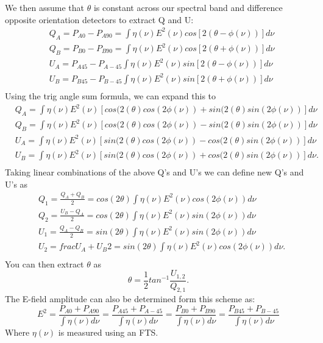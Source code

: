We then assume that $\theta$ is constant across our spectral band and difference opposite orientation detectors to extract Q and U:
\begin{equation}
\begin{split}
&Q_A= P_{A0}-P_{A90}=\int \eta(\nu)E^2(\nu)cos[2(\theta-\phi(\nu))]d\nu \\
&Q_B = P_{B0}-P_{B90}=\int \eta(\nu)E^2(\nu)cos[2(\theta+\phi(\nu))] d\nu \\
&U_A = P_{A45}-P_{A-45}\int \eta(\nu)E^2(\nu)sin[2(\theta-\phi(\nu))] d\nu \\
&U_B =  P_{B45}-P_{B-45}\int \eta(\nu)E^2(\nu)sin[2(\theta+\phi(\nu))] d\nu \\
\end{split}
\end{equation}
Using the trig angle sum formula, we can expand this to
\begin{equation}
\begin{split}
&Q_A= \int \eta(\nu)E^2(\nu)[cos(2(\theta)cos(2\phi(\nu))+sin(2(\theta)sin(2\phi(\nu))]d\nu \\
&Q_B = \int \eta(\nu)E^2(\nu)[cos(2(\theta)cos(2\phi(\nu))-sin(2(\theta)sin(2\phi(\nu))]d\nu \\
&U_A = \int \eta(\nu)E^2(\nu)[sin(2(\theta)cos(2\phi(\nu))-cos(2(\theta)sin(2\phi(\nu))]d\nu \\
&U_B =  \int \eta(\nu)E^2(\nu)[sin(2(\theta)cos(2\phi(\nu))+cos(2(\theta)sin(2\phi(\nu))]d\nu . \\
\end{split}
\end{equation}
Taking linear combinations of the above Q's and U's we can define new Q's and U's as
\begin{equation}
\begin{split}
&Q_1=\frac{Q_A+Q_B}{2}= cos(2\theta)\int \eta(\nu)E^2(\nu)cos(2\phi(\nu))d\nu \\
&Q_2 = \frac{U_B-Q_A}{2}= cos(2\theta)\int \eta(\nu)E^2(\nu)sin(2\phi(\nu))d\nu \\
&U_1 = \frac{Q_A-Q_B}{2}= sin(2\theta)\int \eta(\nu)E^2(\nu)sin(2\phi(\nu))d\nu \\
&U_2 =  frac{U_A+U_B}{2}= sin(2\theta)\int \eta(\nu)E^2(\nu)cos(2\phi(\nu))d\nu. \\
\end{split}
\end{equation}
You can then extract $\theta$ as
\begin{equation}
\theta=\frac{1}{2}tan^{-1}\frac{U_{1,2}}{Q_{2,1}}.
\end{equation}
The E-field amplitude can also be determined form this scheme as:
\begin{equation}
E^2=\frac{P_{A0}+P_{A90}}{\int\eta(\nu)d\nu}=\frac{P_{A45}+P_{A-45}}{\int\eta(\nu)d\nu}=\frac{P_{B0}+P_{B90}}{\int\eta(\nu)d\nu}=\frac{P_{B45}+P_{B-45}}{\int\eta(\nu)d\nu}
\end{equation}
Where $\eta(\nu)$ is measured using an FTS. 

